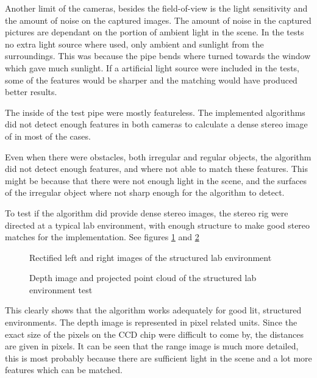 Another limit of the cameras, besides the field-of-view is the light sensitivity and
the amount of noise on the captured images. The amount of noise in the captured pictures
are dependant on the portion of ambient light in the scene. In the tests no extra
light source where used, only ambient and sunlight from the surroundings. This was because
the pipe bends where turned towards the window which gave much sunlight. If a artificial
light source were included in the tests, some of the features would be sharper and the
matching would have produced better results. 

The inside of the test pipe were mostly featureless. The implemented algorithms did not
detect enough features in both cameras to calculate a dense stereo image of in most of the
cases. 

Even when there were obstacles, both irregular and regular objects, the algorithm did not
detect enough features, and where not able to match these features. This might be because
that there were not enough light in the scene, and the surfaces of the irregular object
where not sharp enough for the algorithm to detect. 

To test if the algorithm did provide dense stereo images, the stereo rig were directed at
a typical lab environment, with enough structure to make good stereo matches for the
implementation. See figures \ref{chap8:fig-structured-test-rectified} and
\ref{chap8:fig-structured-test-depth}
\begin{figure}[htbp]
    \centering
    \caption{Rectified left and right images of the structured lab environment}
    \label{chap8:fig-structured-test-rectified}
\end{figure}
\begin{figure}[htbp]
    \centering
    \caption{Depth image and projected point cloud of the structured lab environment test}
    \label{chap8:fig-structured-test-depth}
\end{figure}
This clearly shows that the algorithm works adequately for good lit, structured
environments. The depth image is represented in pixel related units. Since the exact size
of the pixels on the CCD chip were difficult to come by, the distances are given in
pixels. It can be seen that the range image is much more detailed, this is most probably
because there are sufficient light in the scene and a lot more features which can be
matched.

